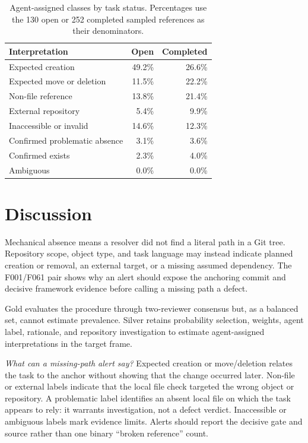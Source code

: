 \documentclass[10pt,conference]{IEEEtran}
\begin{document}
\begin{table}[t]
\caption{Agent-assigned classes by task status. Percentages use the 130 open or 252 completed sampled references as their denominators.}
\label{tab:status}
\centering\scriptsize
\begin{tabular}{p{3.30cm}rr}
\toprule
\textbf{Interpretation} & \textbf{Open} & \textbf{Completed}\\
\midrule
Expected creation & 49.2\% & 26.6\%\\
Expected move or deletion & 11.5\% & 22.2\%\\
Non-file reference & 13.8\% & 21.4\%\\
External repository & 5.4\% & 9.9\%\\
Inaccessible or invalid & 14.6\% & 12.3\%\\
Confirmed problematic absence & 3.1\% & 3.6\%\\
Confirmed exists & 2.3\% & 4.0\%\\
Ambiguous & 0.0\% & 0.0\%\\
\bottomrule
\end{tabular}
\end{table}

\section{Discussion}
Mechanical absence means a resolver did not find a literal path in a Git tree. Repository scope, object type, and task language may instead indicate planned creation or removal, an external target, or a missing assumed dependency. The F001/F061 pair shows why an alert should expose the anchoring commit and decisive framework evidence before calling a missing path a defect.

Gold evaluates the procedure through two-reviewer consensus but, as a balanced set, cannot estimate prevalence. Silver retains probability selection, weights, agent label, rationale, and repository investigation to estimate agent-assigned interpretations in the target frame.

\emph{What can a missing-path alert say?} Expected creation or move/deletion relates the task to the anchor without showing that the change occurred later. Non-file or external labels indicate that the local file check targeted the wrong object or repository. A problematic label identifies an absent local file on which the task appears to rely: it warrants investigation, not a defect verdict. Inaccessible or ambiguous labels mark evidence limits. Alerts should report the decisive gate and source rather than one binary ``broken reference'' count.
\end{document}
